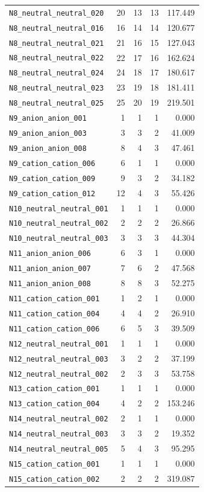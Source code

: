 {\begin{longtable}{@{}p{4.0cm}rrrr@{}}
\texttt{N8\_neutral\_neutral\_020} & 20 & 13 & 13 & 117.449 \\
\texttt{N8\_neutral\_neutral\_016} & 16 & 14 & 14 & 120.677 \\
\texttt{N8\_neutral\_neutral\_021} & 21 & 16 & 15 & 127.043 \\
\texttt{N8\_neutral\_neutral\_022} & 22 & 17 & 16 & 162.624 \\
\texttt{N8\_neutral\_neutral\_024} & 24 & 18 & 17 & 180.617 \\
\texttt{N8\_neutral\_neutral\_023} & 23 & 19 & 18 & 181.411 \\
\texttt{N8\_neutral\_neutral\_025} & 25 & 20 & 19 & 219.501 \\
\addlinespace
\texttt{N9\_anion\_anion\_001} & 1 & 1 & 1 & 0.000 \\
\texttt{N9\_anion\_anion\_003} & 3 & 3 & 2 & 41.009 \\
\texttt{N9\_anion\_anion\_008} & 8 & 4 & 3 & 47.461 \\
\addlinespace
\texttt{N9\_cation\_cation\_006} & 6 & 1 & 1 & 0.000 \\
\texttt{N9\_cation\_cation\_009} & 9 & 3 & 2 & 34.182 \\
\texttt{N9\_cation\_cation\_012} & 12 & 4 & 3 & 55.426 \\
\addlinespace
\texttt{N10\_neutral\_neutral\_001} & 1 & 1 & 1 & 0.000 \\
\texttt{N10\_neutral\_neutral\_002} & 2 & 2 & 2 & 26.866 \\
\texttt{N10\_neutral\_neutral\_003} & 3 & 3 & 3 & 44.304 \\
\addlinespace
\texttt{N11\_anion\_anion\_006} & 6 & 3 & 1 & 0.000 \\
\texttt{N11\_anion\_anion\_007} & 7 & 6 & 2 & 47.568 \\
\texttt{N11\_anion\_anion\_008} & 8 & 8 & 3 & 52.275 \\
\addlinespace
\texttt{N11\_cation\_cation\_001} & 1 & 2 & 1 & 0.000 \\
\texttt{N11\_cation\_cation\_004} & 4 & 4 & 2 & 26.910 \\
\texttt{N11\_cation\_cation\_006} & 6 & 5 & 3 & 39.509 \\
\addlinespace
\texttt{N12\_neutral\_neutral\_001} & 1 & 1 & 1 & 0.000 \\
\texttt{N12\_neutral\_neutral\_003} & 3 & 2 & 2 & 37.199 \\
\texttt{N12\_neutral\_neutral\_002} & 2 & 3 & 3 & 53.758 \\
\addlinespace
\texttt{N13\_cation\_cation\_001} & 1 & 1 & 1 & 0.000 \\
\texttt{N13\_cation\_cation\_004} & 4 & 2 & 2 & 153.246 \\
\addlinespace
\texttt{N14\_neutral\_neutral\_002} & 2 & 1 & 1 & 0.000 \\
\texttt{N14\_neutral\_neutral\_003} & 3 & 3 & 2 & 19.352 \\
\texttt{N14\_neutral\_neutral\_005} & 5 & 4 & 3 & 95.295 \\
\addlinespace
\texttt{N15\_cation\_cation\_001} & 1 & 1 & 1 & 0.000 \\
\texttt{N15\_cation\_cation\_002} & 2 & 2 & 2 & 319.087 \\
\end{longtable}
}
